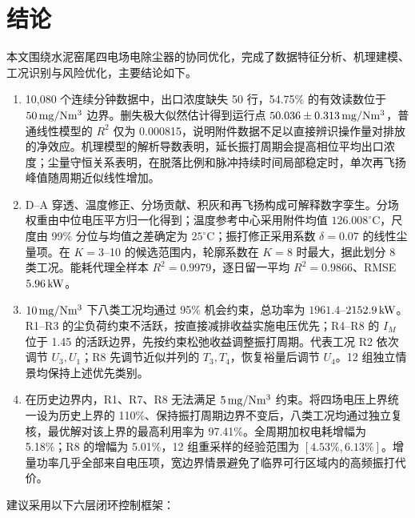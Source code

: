 \section{结论}

本文围绕水泥窑尾四电场电除尘器的协同优化，完成了数据特征分析、机理建模、工况识别与风险优化，主要结论如下。

\begin{enumerate}
  \item 10,080 个连续分钟数据中，出口浓度缺失 50 行，54.75\% 的有效读数位于 $50\,\mathrm{mg/Nm^3}$ 边界。删失极大似然估计得到运行点 $50.036\pm0.313\,\mathrm{mg/Nm^3}$，普通线性模型的 $R^2$ 仅为 0.000815，说明附件数据不足以直接辨识操作量对排放的净效应。机理模型的解析导数表明，延长振打周期会提高相位平均出口浓度；尘量守恒关系表明，在脱落比例和脉冲持续时间局部稳定时，单次再飞扬峰值随周期近似线性增加。
  \item D--A 穿透、温度修正、分场贡献、积灰和再飞扬构成可解释数字孪生。分场权重由中位电压平方归一化得到；温度参考中心采用附件均值 $126.008^\circ\mathrm C$，尺度由 99\% 分位与均值之差确定为 $25^\circ\mathrm C$；振打修正采用系数 $\delta=0.07$ 的线性尘量项。在 $K=3$--10 的候选范围内，轮廓系数在 $K=8$ 时最大，据此划分 8 类工况。能耗代理全样本 $R^2=0.9979$，逐日留一平均 $R^2=0.9866$、RMSE $5.96\,\mathrm{kW}$。
  \item $10\,\mathrm{mg/Nm^3}$ 下八类工况均通过 95\% 机会约束，总功率为 $1961.4$--$2152.9\,\mathrm{kW}$。R1--R3 的尘负荷约束不活跃，按直接减排收益实施电压优先；R4--R8 的 $I_M$ 位于 1.45 的活跃边界，先按约束松弛收益调整振打周期。代表工况 R2 依次调节 $U_3,U_1$；R8 先调节近似并列的 $T_3,T_4$，恢复裕量后调节 $U_4$。12 组独立情景均保持上述优先类别。
  \item 在历史边界内，R1、R7、R8 无法满足 $5\,\mathrm{mg/Nm^3}$ 约束。将四场电压上界统一设为历史上界的 110\%、保持振打周期边界不变后，八类工况均通过独立复核，最优解对该上界的最高利用率为 97.41\%。全周期加权电耗增幅为 5.18\%；R8 的增幅为 5.01\%，12 组重采样的经验范围为 $[4.53\%,6.13\%]$。增量功率几乎全部来自电压项，宽边界情景避免了临界可行区域内的高频振打代价。
\end{enumerate}

建议采用以下六层闭环控制框架：


